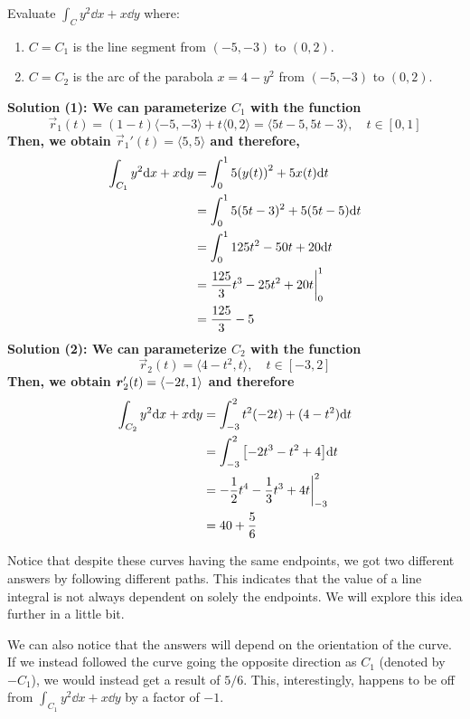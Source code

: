 \begin{example}
    Evaluate $\int_C y^2\dd x + x\dd y$ where:
    \begin{enumerate}
        \item $C = C_1$ is the line segment from $(-5, -3)$ to $(0, 2)$.
        \item $C = C_2$ is the arc of the parabola $x=4-y^2$ from $(-5, -3)$ to $(0, 2)$.
    \end{enumerate}
    \par\bf{Solution (1):}
        We can parameterize $C_1$ with the function
        \[ \vec r_1(t) = (1-t)\langle -5, -3\rangle + t\langle 0, 2\rangle = \langle 5t-5, 5t-3 \rangle, \quad t\in[0,1] \]
        Then, we obtain $\vec r_1'(t) = \langle 5, 5 \rangle$ and therefore,
        \begin{align*}
            \int_{C_1} y^2\dd x + x\dd y &= \int_0^1 5\pqty{y(t)}^2 + 5x(t)\dd t \\
            &= \int_0^1 5(5t-3)^2 + 5(5t-5)\dd t \\
            &= \int_0^1 125t^2 - 50t + 20\dd t \\
            &= \frac{125}{3}t^3 - 25t^2+20t \biggr|_0^1 \\
            &= \frac{125}{3}-5
        \end{align*}
    \bf{Solution (2):}
        We can parameterize $C_2$ with the function
        \[ \vec r_2(t) = \langle 4-t^2, t\rangle, \quad t\in[-3, 2]\]
        Then, we obtain $\boldsymbol{r}_2'(t) = \left\langle -2t, 1\right\rangle$ and therefore
        \begin{align*}
            \int_{C_2}y^2\dd x + x\dd y &= \int_{-3}^{2} t^2(-2t)+(4-t^2)\dd t \\
            &= \int_{-3}^2 \bqty{-2t^3-t^2+4}\dd t \\
            &= -\frac{1}{2}t^4-\frac{1}{3}t^3+4t\biggr|_{-3}^2 \\
            &= 40+\frac{5}{6}
        \end{align*}
\end{example}
Notice that despite these curves having the same endpoints, we got two different answers by following different paths. This indicates that the value of a line integral is not always dependent on solely the endpoints. We will explore this idea further in a little bit. \par
We can also notice that the answers will depend on the orientation of the curve. If we instead followed the curve going the opposite direction as $C_1$ (denoted by $-C_1$), we would instead get a result of $5/6$. This, interestingly, happens to be off from $\int_{C_1} y^2\dd x + x\dd y$ by a factor of $-1$. \par
